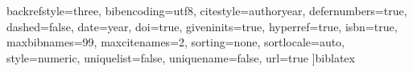 	backrefstyle=three,		%
	bibencoding=utf8,		%
	citestyle=authoryear,	%
	defernumbers=true,		%
	dashed=false,			%
	date=year,				%
	doi=true,				%
	giveninits=true,		%
	hyperref=true,			%
	isbn=true,				%
	maxbibnames=99,			%
	maxcitenames=2,			%
	sorting=none,
	sortlocale=auto,		%
	style=numeric,
	uniquelist=false,		%
	uniquename=false,		%
	url=true				%
]{biblatex}
\usepackage[
	autostyle=true,			%
	strict=true				%
]{csquotes}					%
\usepackage[
]{acro}						%
\usepackage{imakeidx}		%
\usepackage[
	intoc,					%
	nomentbl,				%
	noprefix,				%
]{nomencl}					%
\usepackage{listings}		%
\usepackage{xurl}			%


\usepackage{animate}
\usepackage{subfig}


